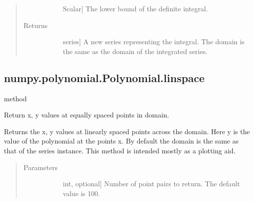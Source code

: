 \documentclass[letterpaper,10pt,english]{sphinxmanual}
\begin{document}
\begin{fulllineitems}
\begin{fulllineitems}
\begin{quote}
\begin{description}
\begin{description}
\item[{}] \leavevmode{[}Scalar{]}
The lower bound of the definite integral.

\end{description}

\item[{Returns}] \leavevmode\begin{description}
\item[{}] \leavevmode{[}series{]}
A new series representing the integral. The domain is the same
as the domain of the integrated series.

\end{description}

\end{description}\end{quote}

\end{fulllineitems}



\subsection{numpy.polynomial.Polynomial.linspace}
\label{\detokenize{generated/generated/numpy.polynomial.Polynomial.linspace:numpy-polynomial-polynomial-linspace}}\label{\detokenize{generated/generated/numpy.polynomial.Polynomial.linspace::doc}}
method

\begin{fulllineitems}
\label{\detokenize{generated/generated/numpy.polynomial.Polynomial.linspace:numpy.polynomial.Polynomial.linspace}}
Return x, y values at equally spaced points in domain.

Returns the x, y values at  linearly spaced points across the
domain.  Here y is the value of the polynomial at the points x. By
default the domain is the same as that of the series instance.
This method is intended mostly as a plotting aid.

\begin{quote}\begin{description}
\item[{Parameters}] \leavevmode\begin{description}
\item[{}] \leavevmode{[}int, optional{]}
Number of point pairs to return. The default value is 100.


\end{description}
\end{description}
\end{quote}
\end{fulllineitems}
\end{fulllineitems}
\end{document}
